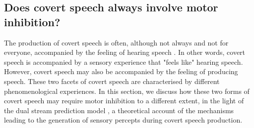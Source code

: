 \documentclass[utf8]{template/frontiersSCNS} %
\begin{document}

\subsection{Does covert speech always involve motor inhibition?}

The production of covert speech is often, although not always and not for everyone, accompanied by the feeling of hearing speech \cite{hurlburt_investigating_2011}. In other words, covert speech is accompanied by a sensory experience that "feels like" hearing speech. However, covert speech may also be accompanied by the feeling of producing speech. These two facets of covert speech are characterised by different phenomenological experiences. In this section, we discuss how these two forms of covert speech may require motor inhibition to a different extent, in the light of the dual stream prediction model \citep{tian_mental_2012, tian_effect_2013, tian_mental_2016}, a theoretical account of the mechanisms leading to the generation of sensory percepts during covert speech production.

\end{document}
